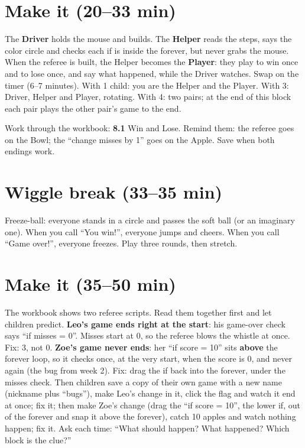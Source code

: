 \section{Make it (20--33 min)}
\begin{pairroles}
The \textbf{Driver} holds the mouse and builds. The \textbf{Helper} reads the steps, says the color circle and checks each if is inside the forever, but never grabs the mouse. When the referee is built, the Helper becomes the \textbf{Player}: they play to win once and to lose once, and say what happened, while the Driver watches. Swap on the timer (6--7 minutes). With 1 child: you are the Helper and the Player. With 3: Driver, Helper and Player, rotating. With 4: two pairs; at the end of this block each pair plays the other pair's game to the end.
\end{pairroles}

Work through the workbook: \textbf{8.1} Win and Lose. Remind them: the referee goes on the Bowl; the \enquote{change misses by 1} goes on the Apple. Save when both endings work.

\section{Wiggle break (33--35 min)}
Freeze-ball: everyone stands in a circle and passes the soft ball (or an imaginary one). When you call \enquote{You win!}, everyone jumps and cheers. When you call \enquote{Game over!}, everyone freezes. Play three rounds, then stretch.

\section{Make it (35--50 min)}
\begin{bughunt}
The workbook shows two referee scripts. Read them together first and let children predict. \textbf{Leo's game ends right at the start}: his game-over check says \enquote{if misses = 0}. Misses start at 0, so the referee blows the whistle at once. Fix: 3, not 0. \textbf{Zoe's game never ends}: her \enquote{if score = 10} sits \textbf{above} the forever loop, so it checks once, at the very start, when the score is 0, and never again (the bug from week 2). Fix: drag the if back into the forever, under the misses check. Then children save a copy of their own game with a new name (nickname plus \enquote{bugs}), make Leo's change in it, click the flag and watch it end at once; fix it; then make Zoe's change (drag the \enquote{if score = 10}, the lower if, out of the forever and snap it above the forever), catch 10 apples and watch nothing happen; fix it. Ask each time: \enquote{What should happen? What happened? Which block is the clue?}
\end{bughunt}

